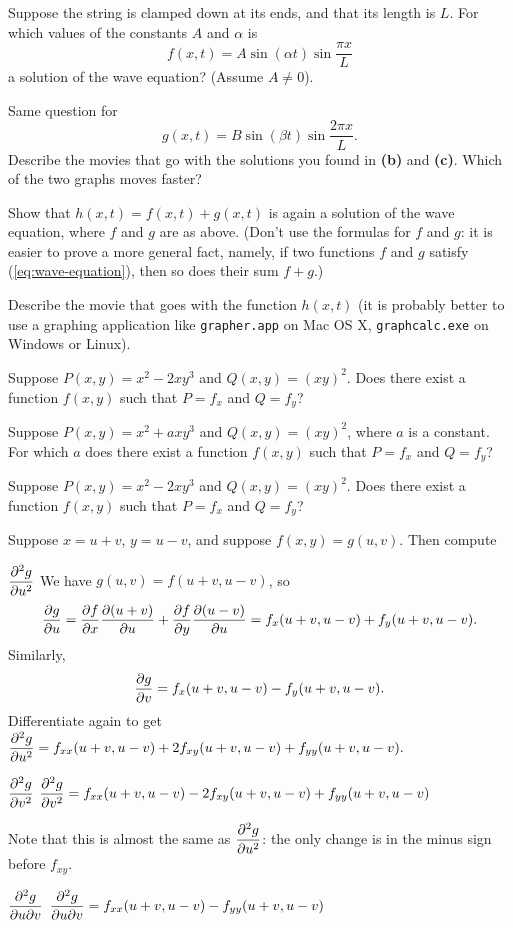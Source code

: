 \begin{multicols}{2}
\subprob Suppose the string is clamped down at its ends, and that its
length is $L$.  For which values of the constants $A$ and $\alpha$ is
\[
  f(x, t) = A\sin(\alpha t) \sin \frac{\pi x}{L}
\]
a solution of the wave equation?  (Assume $A\neq0$).

\subprob Same question for 
\[
  g(x, t) =  B\sin(\beta t) \sin \frac{2\pi x}{L}.
\]
\subprob Describe the movies that go with the solutions you found in \textbf{(b)} and \textbf{(c)}.  Which of the two graphs moves faster?

\subprob Show that $h(x, t) = f(x, t)+g(x, t)$ is again a solution of the
wave equation, where $f$ and $g$ are as above.  (Don't use the formulas for
$f$ and $g$: it is easier to prove a more general fact, namely, if two
functions $f$ and $g$ satisfy (\ref{eq:wave-equation}), then so does their
sum $f+g$.)


\subprob Describe the movie that goes with the function $h(x,t)$ (it is probably better to use a graphing application like \texttt{grapher.app} on Mac OS X,
\texttt{graphcalc.exe} on Windows or Linux).

\problem Suppose $P(x, y) = x^2-2xy^3$ and $Q(x, y) = (xy)^2$.  Does  
there exist a function $f(x, y)$ such that $P= f_x$ and $Q= f_y$?

\problem Suppose $P(x, y) = x^2+axy^3$ and $Q(x, y) = (xy)^2$, where $a$  
is a constant.  For which $a$ does there exist a function $f(x, y)$ such
that $P= f_x$ and $Q= f_y$?

\problem Suppose $P(x, y) = x^2-2xy^3$ and $Q(x, y) = (xy)^2$.  Does  
there exist a function $f(x, y)$ such that $P= f_x$ and $Q= f_y$?

\problem Suppose $x=u+v$, $y=u-v$, and suppose $f(x, y) = g(u, v)$.  
Then compute

\subprob $\dfrac{\partial^2 g}{\partial u^2}$%
\answer
We have $g(u,v) = f(u+v, u-v)$, so
\[
  \frac{\partial g}{\partial u} = \frac{\partial f}{\partial x} \frac{\partial (u+v)}{\partial u} + \frac{\partial f}{\partial y} \frac{\partial (u-v)}{\partial u}
  = f_x(u+v, u-v)+f_y(u+v, u-v).
\]
Similarly,
\[
  \frac{\partial g}{\partial v} = f_x(u+v, u-v) - f_y(u+v, u-v).
\]
Differentiate again to get
\(\displaystyle
  \frac{\partial^2 g}{\partial u^2}
  = f_{xx}(u+v, u-v)+2f_{xy}(u+v, u-v)+f_{yy}(u+v, u-v).
\)
\endanswer

\subprob $\dfrac{\partial^2 g}{\partial v^2}$
\answer
\(\displaystyle 
\frac{\partial^2 g}{\partial v^2}
= f_{xx}(u+v, u-v)-2f_{xy}(u+v, u-v)+f_{yy}(u+v, u-v)
\)

Note that this is almost the same as $\dfrac{\partial^2g}{\partial u^2}$: the only change is in the minus sign before $f_{xy}$.
\endanswer

\subprob   $\dfrac{\partial^2 g}{\partial u\partial v}$
\answer
   $\displaystyle\frac{\partial^2 g}{\partial u\partial v}= f_{xx}(u+v, u-v) - f_{yy}(u+v, u-v)$
\endanswer


\end{multicols}
